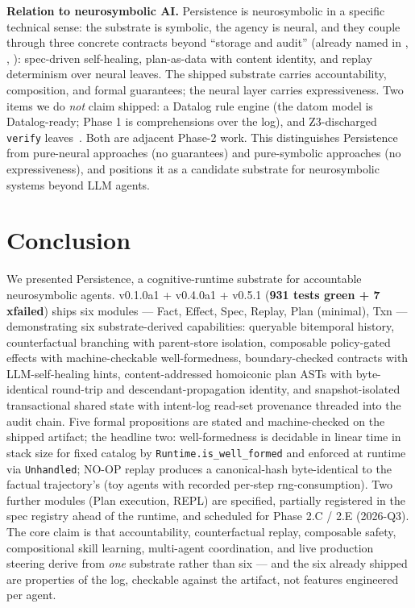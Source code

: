 \documentclass[anon]{nesy2026}   %
\newcommand{\C}[1]{\texttt{#1}}
\begin{document}
\textbf{Relation to neurosymbolic AI.} Persistence is neurosymbolic in a specific technical sense: the substrate is symbolic, the agency is neural, and they couple through three concrete contracts beyond ``storage and audit'' (already named in , , ): spec-driven self-healing, plan-as-data with content identity, and replay determinism over neural leaves. The shipped substrate carries accountability, composition, and formal guarantees; the neural layer carries expressiveness. Two items we do \emph{not} claim shipped: a Datalog rule engine (the datom model is Datalog-ready; Phase 1 is comprehensions over the log), and Z3-discharged \C{verify} leaves~\citep{fan2024proofofthought}. Both are adjacent Phase-2 work. This distinguishes Persistence from pure-neural approaches (no guarantees) and pure-symbolic approaches (no expressiveness), and positions it as a candidate substrate for neurosymbolic systems beyond LLM agents.

\section{Conclusion}\label{sec:conclusion}

We presented Persistence, a cognitive-runtime substrate for accountable neurosymbolic agents. v0.1.0a1 + v0.4.0a1 + v0.5.1 (\textbf{931 tests green + 7 xfailed}) ships six modules --- Fact, Effect, Spec, Replay, Plan (minimal), Txn --- demonstrating six substrate-derived capabilities: queryable bitemporal history, counterfactual branching with parent-store isolation, composable policy-gated effects with machine-checkable well-formedness, boundary-checked contracts with LLM-self-healing hints, content-addressed homoiconic plan ASTs with byte-identical round-trip and descendant-propagation identity, and snapshot-isolated transactional shared state with intent-log read-set provenance threaded into the audit chain. Five formal propositions are stated and machine-checked on the shipped artifact; the headline two: well-formedness is decidable in linear time in stack size for fixed catalog by \C{Runtime.is\_well\_formed} and enforced at runtime via \C{Unhandled}; NO-OP replay produces a canonical-hash byte-identical to the factual trajectory's (toy agents with recorded per-step rng-consumption). Two further modules (Plan execution, REPL) are specified, partially registered in the spec registry ahead of the runtime, and scheduled for Phase 2.C / 2.E (2026-Q3). The core claim is that accountability, counterfactual replay, composable safety, compositional skill learning, multi-agent coordination, and live production steering derive from \emph{one} substrate rather than six --- and the six already shipped are properties of the log, checkable against the artifact, not features engineered per agent.
\end{document}
